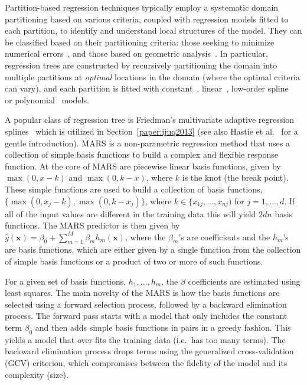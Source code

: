 Partition-based regression techniques typically employ a systematic domain partitioning based on various criteria, coupled with regression models fitted to each partition, to identify and understand local structures of the model.
%
They can be classified based on their partitioning criteria: those seeking to minimize numerical errors~\cite{Friedman1991,AlexanderGrimshaw1996,BreimanFriedmanOlshen1984a,ChaudhuriHuangLoh1994,ChipmanMcCulloch2010}, and those based on geometric analysis~\cite{GerberPotter2012,GerberRubelBremer2011,LiLueChen2000}.
%
In particular, regression trees are constructed by recursively partitioning the domain into multiple partitions at \emph{optimal} locations in the domain (where the optimal criteria can vary), and each partition is fitted with constant~\cite{BreimanFriedmanOlshen1984a}, linear~\cite{AlexanderGrimshaw1996,LiLueChen2000}, low-order spline~\cite{Friedman1991} or polynomial~\cite{ChaudhuriHuangLoh1994} models.

A popular class of regression tree is Friedman's multivariate adaptive regression splines~\cite{Friedman1991} which is utilized in Section~\ref{paper:ijuq2013} (see also Hastie et al.~\cite{HastieTibshiraniFriedman2008} for a gentle introduction).
%
MARS is a non-parametric regression method that uses a collection of simple basis functions to build a complex and flexible response function.
%
At the core of MARS are piecewise linear basis functions, given by $\max(0, x - k)$ and $\max(0, k - x)$, where $k$ is the knot (the break point).
%
These simple functions are used to build a collection of basis functions, $\{\max(0, x_j-k), \max(0,k-x_j)\}$, where $k \in \{x_{1j}, \dots, x_{nj})$ for $j = 1, \dots, d$.
%
If all of the input values are different in the training data this will yield $2dn$ basis functions. The MARS predictor is then given by $\hat{y}(\mathbf{x}) = \beta_0 + \sum_{m=1}^M \beta_m h_m(\mathbf{x})$, where the $\beta_m$'s are coefficients and the $h_m$'s are basis functions, which are either given by a single function from the collection of simple basis functions or a product of
two or more of such functions.

For a given set of basis functions, $h_1, \dots, h_m$, the $\beta$ coefficients are estimated using least squares.
%
The main novelty of the MARS is how the basis functions are selected using a forward selection process, followed by a backward elimination process.
%
The forward pass starts with a model that only includes the constant term $\beta_0$ and then adds simple basis functions in pairs in a greedy fashion.
%
This yields a model that over fits the training data (i.e.\ has too many terms).
%
The backward elimination process drops terms using the generalized cross-validation (GCV) criterion, which compromises between the fidelity of the model and its complexity (size).

